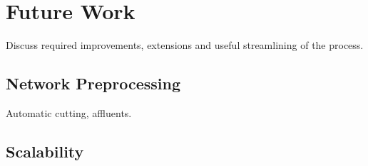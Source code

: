 \chapter{Future Work} \label{c:futurework}
Discuss required improvements, extensions and useful streamlining of the process.

\section{Network Preprocessing}
Automatic cutting, affluents.

\section{Scalability} \label{s:scalability}